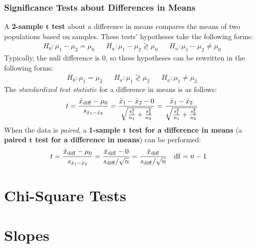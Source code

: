 \documentclass[../AP_Statistics.tex]{subfiles}
\begin{document}
			\subsection*{Significance Tests about Differences in Means}
				A \textbf{2-sample $\pmb{t}$ test} about a difference in means compares the means of two populations based on samples. These tests' hypotheses take the following forms:
				\begin{align*}
					H_0: \mu_1 - \mu_2 = \mu_0 && H_a: \mu_1 - \mu_2 \gtrless \mu_0 && H_a: \mu_1 - \mu_2 \ne \mu_0
				\end{align*}
				Typically, the null difference is 0, so these hypotheses can be rewritten in the following forms:
				\begin{align*}
					H_0: \mu_1 = \mu_2 && H_a: \mu_1 \gtrless \mu_2 && H_a: \mu_1 \ne \mu_2
				\end{align*}
				The \emph{standardized test statistic} for a difference in means is as follows:
				\[t = \frac{\bar{x}_{\mathrm{diff}} - \mu_0}{s_{\bar{x}_1 - \bar{x}_2}} = \frac{\bar{x}_1 - \bar{x}_2 - 0}{\sqrt{\frac{s_1^2}{n_1} + \frac{s_2^2}{n_2}}} = \frac{\bar{x}_1 - \bar{x}_2}{\sqrt{\frac{s_1^2}{n_1} + \frac{s_2^2}{n_2}}}\]
				When the data is \emph{paired}, a \textbf{1-sample $\pmb{t}$ test for a difference in means} (a \textbf{paired $\pmb{t}$ test for a difference in means}) can be performed:
				\begin{align*}
					t &= \frac{\bar{x}_{\mathrm{diff}} - \mu_0}{s_{\bar{x}_1 - \bar{x}_2}} = \frac{\bar{x}_{\mathrm{diff}} - 0}{s_{\mathrm{diff}}/\sqrt{n}} = \frac{\bar{x}_{\mathrm{diff}}}{s_{\mathrm{diff}}/\sqrt{n}} & \operatorname{\mathrm{df}} &= n - 1
				\end{align*}
	\chapter{Chi-Square Tests}
	\chapter{Slopes}
\end{document}
